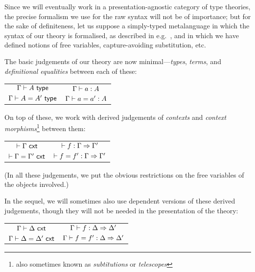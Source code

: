 \documentclass{amsart}
\begin{document}
\begin{para}
Since we will eventually work in a presentation-agnostic category of type theories, the precise formalism we use for the raw syntax will not be of importance; but for the sake of definiteness, let us suppose a simply-typed metalanguage in which the syntax of our theory is formalised, as described in e.g.\ \cite[6.1]{pitts:categorial-logic}, and in which we have defined notions of free variables, capture-avoiding substitution, etc.

The basic judgements of our theory are now minimal---\emph{types}, \emph{terms}, and \emph{definitional equalities} between each of these:
\end{para}
\begin{center}\begin{tabular}{@{\ }c@{\hskip 0.75in}c@{\ }}
$\Gamma \vdash A \ \mathsf{type} $ & $ \Gamma \vdash a:A $ \\ \rule{0pt}{3ex} 
$\Gamma \vdash A = A' \ \mathsf{type} $& $ \Gamma \vdash a = a' : A $ \\
\end{tabular}
\end{center}

On top of these, we work with derived judgements of \emph{contexts} and \emph{context morphisms}\footnote{also sometimes known as \emph{subtitutions} or \emph{telescopes}} between them:
\begin{center}\begin{tabular}{@{\ }c@{\hskip 0.75in}c@{\ }}
$\vdash \Gamma \ \mathsf{cxt}$ & $ \vdash  f : \Gamma \Rightarrow \Gamma' $  \\ \rule{0pt}{3ex} 
$\vdash \Gamma = \Gamma' \ \mathsf{cxt}$ &  $\vdash { f} = { f}' : \Gamma \Rightarrow \Gamma'$ \\
\end{tabular}
\end{center}

(In all these judgements, we put the obvious restrictions on the free variables of the objects involved.)

In the sequel, we will sometimes also use dependent versions of these derived judgements, though they will not be needed in the presentation of the theory:
\begin{center}\begin{tabular}{@{\ }c@{\hskip 0.75in}c@{\ }}
$ \Gamma \vdash \Delta \ \mathsf{cxt}$ & $\Gamma \vdash { f} : \Delta \Rightarrow \Delta' $  \\ \rule{0pt}{3ex} 
$ \Gamma \vdash \Delta = \Delta' \ \mathsf{cxt}$ & $\Gamma \vdash { f} = { f}' : \Delta \Rightarrow \Delta'$ \\
\end{tabular}
\end{center}
\end{document}
